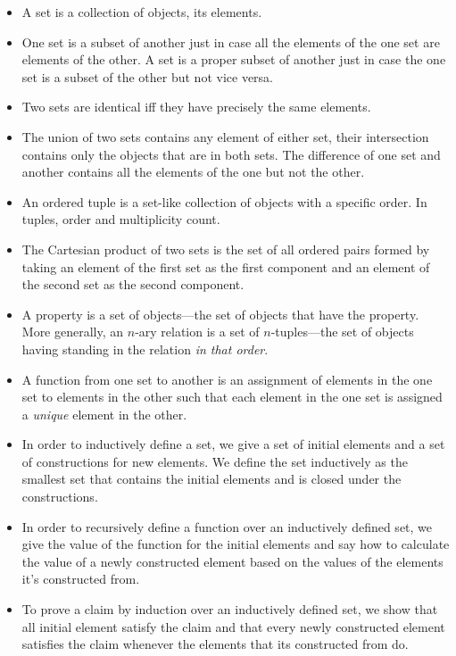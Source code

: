 	\begin{itemize}
	
		\item A set is a collection of objects, its elements.
		
		\item One set is a subset of another just in case all the elements of the one set are elements of the other. A set is a proper subset of another just in case the one set is a subset of the other but not vice versa. 
				
		\item Two sets are identical iff they have precisely the same elements. 
		
		\item The union of two sets contains any element of either set, their intersection contains only the objects that are in both sets. The difference of one set and another contains all the elements of the one but not the other.
		
		\item An ordered tuple is a set-like collection of objects with a specific order. In tuples, order and multiplicity count.
		
		\item The Cartesian product of two sets is the set of all ordered pairs formed by taking an element of the first set as the first component and an element of the second set as the second component. 
			
		\item A property is a set of objects---the set of objects that have the property. More generally, an $n$-ary relation is a set of $n$-tuples---the set of objects having standing in the relation \emph{in that order}.
		
		\item A function from one set to another is an assignment of elements in the one set to elements in the other such that each element in the one set is assigned a \emph{unique} element in the other.
		
		\item In order to inductively define a set, we give a set of initial elements and a set of constructions for new elements. We define the set inductively as the smallest set that contains the initial elements and is closed under the constructions.
		
		\item In order to recursively define a function over an inductively defined set, we give the value of the function for the initial elements and say how to calculate the value of a newly constructed element based on the values of the elements it's constructed from.
		
		\item To prove a claim by induction over an inductively defined set, we show that all initial element satisfy the claim and that every newly constructed element satisfies the claim whenever the elements that its constructed from do.
			
	\end{itemize}

